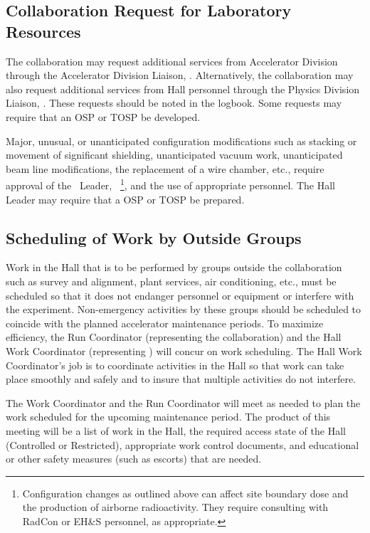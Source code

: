 \documentclass[11pt]{article}
\begin{document}
\subsection{Collaboration Request for Laboratory Resources}
\indent

The collaboration may request additional services from Accelerator
Division through the Accelerator Division Liaison, \ACCDIVLIAISON.  Alternatively,
the collaboration may also request additional services from Hall personnel 
through the Physics Division Liaison, \PHYSDIVLIAISON. These requests 
should be noted in the logbook. Some requests may require that an
OSP or TOSP be developed.

Major, unusual, or unanticipated configuration modifications such as stacking 
or movement of significant shielding, unanticipated vacuum work, unanticipated
beam line modifications, the replacement of a wire chamber, etc., require 
approval of the \HALL\ Leader, \HALLLEADER\ 
\footnote{\label{fn1}Configuration changes as outlined above can affect site
boundary dose and the production of airborne radioactivity. They require
consulting with RadCon or EH\&S personnel, as appropriate.}, and the use of 
appropriate personnel. The Hall Leader may require that a OSP or 
TOSP be prepared.

\subsection{Scheduling of Work by Outside Groups }
\indent

Work in the Hall that is to be performed by groups outside the collaboration 
such as survey and alignment, plant services, air conditioning, etc., 
must be scheduled so that it does not 
endanger personnel or equipment or interfere with the experiment.
Non-emergency activities by these groups should be
scheduled to coincide with the planned accelerator maintenance periods. 
To maximize efficiency, the Run Coordinator (representing the collaboration)
and the Hall Work Coordinator (representing \HALL) will concur
on work scheduling.
The Hall Work Coordinator's job is to 
coordinate activities in the Hall so that work can take place smoothly 
and safely and to insure that multiple activities do not interfere. 

The Work Coordinator and the Run
Coordinator will meet as needed to plan the work
scheduled for the upcoming maintenance period.
The product of this meeting will be
a list of work in the Hall, the required access state of the
Hall (Controlled or Restricted), appropriate work 
control documents, and educational or other
safety measures (such as escorts) that are needed.
\end{document}
